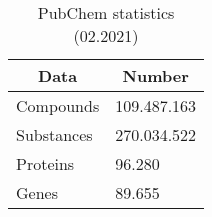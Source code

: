 \begin{table}[]
\caption{PubChem statistics (02.2021)}
\centering
\begin{tabular}{|l|l|}
\hline
\multicolumn{1}{|c|}{\textbf{Data}} & \multicolumn{1}{c|}{\textbf{Number}} \\ \hline
Compounds                           & 109.487.163                          \\ \hline
Substances                          & 270.034.522                          \\ \hline
Proteins                            & 96.280                               \\ \hline
Genes                               & 89.655                               \\ \hline
\end{tabular}
\label{tab:pubchem_stats}
\end{table}